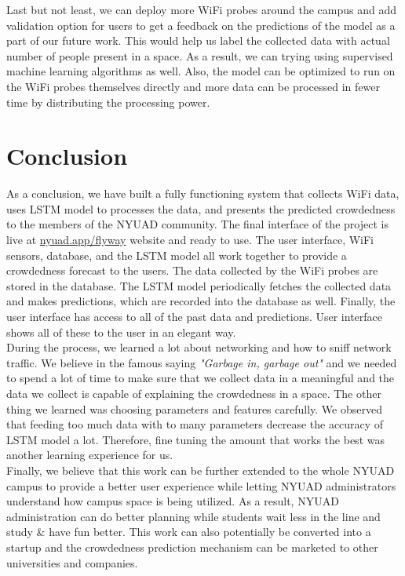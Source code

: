 \documentclass[journal, 12pt]{IEEEtran}
\begin{document}
\noindent Last but not least, we can deploy more WiFi probes around the campus and add validation option for users to get a feedback on the predictions of the model as a part of our future work. This would help us label the collected data with actual number of people present in a space. As a result, we can trying using supervised machine learning algorithms as well. Also, the model can be optimized to run on the WiFi probes themselves directly and more data can be processed in fewer time by distributing the processing power.

\section{Conclusion}
\noindent As a conclusion, we have built a fully functioning system that collects WiFi data, uses LSTM model to processes the data, and presents the predicted crowdedness to the members of the NYUAD community. The final interface of the project is live at \href{https://nyuad.app/flyway}{nyuad.app/flyway} website and ready to use. The user interface, WiFi sensors, database, and the LSTM model all work together to provide a crowdedness forecast to the users. The data collected by the WiFi probes are stored in the database. The LSTM model periodically fetches the collected data and makes predictions, which are recorded into the database as well. Finally, the user interface has access to all of the past data and predictions. User interface shows all of these to the user in an elegant way.\\

\noindent During the process, we learned a lot about networking and how to sniff network traffic. We believe in the famous saying \textit{"Garbage in, garbage out"} and we needed to spend a lot of time to make sure that we collect data in a meaningful and the data we collect is capable of explaining the crowdedness in a space. The other thing we learned was choosing parameters and features carefully. We observed that feeding too much data with to many parameters decrease the accuracy of LSTM model a lot. Therefore, fine tuning the amount that works the best was another learning experience for us.\\

\noindent Finally, we believe that this work can be further extended to the whole NYUAD campus to provide a better user experience while letting NYUAD administrators understand how campus space is being utilized. As a result, NYUAD administration can do better planning while students wait less in the line and study \& have fun better. This work can also potentially be converted into a startup and the crowdedness prediction mechanism can be marketed to other universities and companies.
\end{document}
